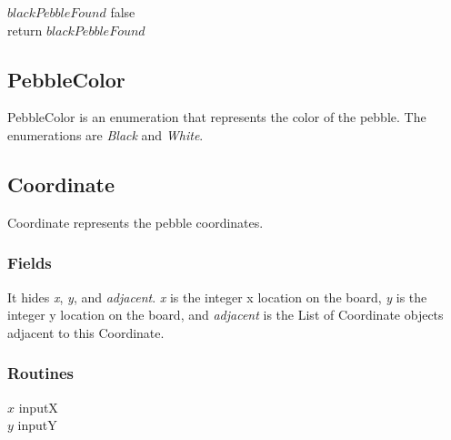 \documentclass{article}
\begin{document}
\begin{algorithm}[H]
\SetAlgoLined
\caption{}
$blackPebbleFound$ \xleftarrow[]{} false\\
return $blackPebbleFound$\\
\end{algorithm}


\subsection{PebbleColor}
PebbleColor is an enumeration that represents the color of the pebble. The enumerations are \textit{Black} and \textit{White}.

\subsection{Coordinate}
Coordinate represents the pebble coordinates. 

\subsubsection{Fields}It hides \textit{x}, \textit{y}, and \textit{adjacent}. \textit{x} is the integer x location on the board, \textit{y} is the integer y location on the board, and \textit{adjacent} is the List of Coordinate objects adjacent to this Coordinate.

\subsubsection{Routines}

\begin{algorithm}[H]
\SetAlgoLined
\caption{}
$x$ \xleftarrow[]{} inputX\\
$y$ \xleftarrow[]{} inputY\\
\end{algorithm}
\end{document}
